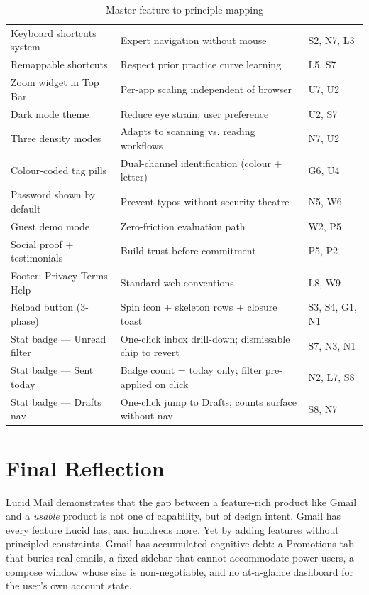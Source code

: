 \documentclass[12pt,a4paper]{report}
\begin{document}
\begin{table}[H]
\begin{tabularx}{\textwidth}{lXl}
  Keyboard shortcuts system    & Expert navigation without mouse                     & S2, N7, L3\\
  Remappable shortcuts         & Respect prior practice curve learning               & L5, S7\\
  Zoom widget in Top Bar       & Per-app scaling independent of browser              & U7, U2\\
  Dark mode theme              & Reduce eye strain; user preference                  & U2, S7\\
  Three density modes          & Adapts to scanning vs. reading workflows            & N7, U2\\
  Colour-coded tag pills       & Dual-channel identification (colour + letter)       & G6, U4\\
  Password shown by default    & Prevent typos without security theatre               & N5, W6\\
  Guest demo mode              & Zero-friction evaluation path                       & W2, P5\\
  Social proof + testimonials  & Build trust before commitment                       & P5, P2\\
  Footer: Privacy Terms Help   & Standard web conventions                            & L8, W9\\
  Reload button (3-phase)      & Spin icon + skeleton rows + closure toast          & S3, S4, G1, N1\\
  Stat badge — Unread filter   & One-click inbox drill-down; dismissable chip to revert & S7, N3, N1\\
  Stat badge — Sent today      & Badge count = today only; filter pre-applied on click   & N2, L7, S8\\
  Stat badge — Drafts nav      & One-click jump to Drafts; counts surface without nav & S8, N7\\
  \bottomrule
\end{tabularx}
\caption{Master feature-to-principle mapping}
\end{table}

\section{Final Reflection}

Lucid Mail demonstrates that the gap between a feature-rich product like Gmail and a
\textit{usable} product is not one of capability, but of design intent. Gmail has every
feature Lucid has, and hundreds more. Yet by adding features without principled constraints,
Gmail has accumulated cognitive debt: a Promotions tab that buries real emails, a fixed
sidebar that cannot accommodate power users, a compose window whose size is non-negotiable,
and no at-a-glance dashboard for the user's own account state.
\end{document}
